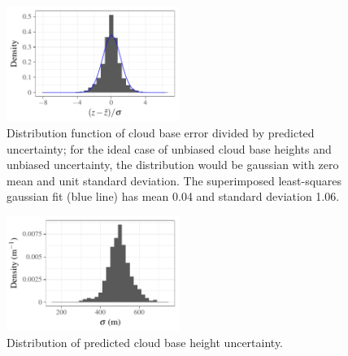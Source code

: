 \documentclass[amt,manuscript]{copernicus}\usepackage[]{graphicx}\usepackage[]{color}
\newenvironment{knitrout}{}{} %
\begin{document}
\begin{figure}
  \centering
\begin{knitrout}
\color{fgcolor}

{\centering \includegraphics[width=0.5\textwidth]{figure/method-combo-eval-pull-1} 

}



\end{knitrout}
  \caption{Distribution function of cloud base error divided by predicted
    uncertainty; for the ideal case of unbiased cloud base heights and unbiased
    uncertainty, the distribution would be gaussian with zero mean and unit
    standard deviation.  The superimposed least-squares gaussian fit (blue line)
    has mean 0.04 and
    standard deviation 1.06.}
  \label{fig:pull}
\end{figure}

\begin{figure}
  \centering
\begin{knitrout}
\color{fgcolor}

{\centering \includegraphics[width=0.5\textwidth]{figure/method-combo-eval-rmse-1} 

}



\end{knitrout}
  \caption{Distribution of predicted cloud base height uncertainty.}
  \label{fig:uncertainty}
\end{figure}

\end{document}
